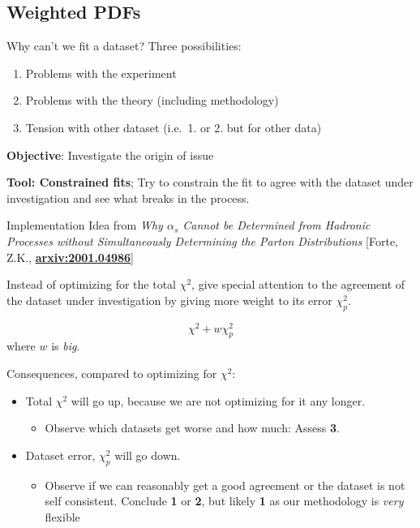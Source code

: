 \author[Zahari Kassabov]{}
\subsection{Weighted PDFs}
\begin{frame}{Why can't we fit a dataset?}
\protect\hypertarget{why-cant-we-fit-a-dataset}{}
Three possibilities:

\begin{enumerate}
\tightlist
\item
  Problems with the experiment
\item
  Problems with the theory (including methodology)
\item
  Tension with other dataset (i.e.~1. or 2. but for other data)
\end{enumerate}

\textbf{Objective}: Investigate the origin of issue

\textbf{Tool: Constrained fits}; Try to constrain the fit to agree with
the dataset under investigation and see what breaks in the process.
\end{frame}

\begin{frame}{Implementation}
\protect\hypertarget{implementation}{}
Idea from \emph{Why \(\alpha_s\) Cannot be Determined from Hadronic
Processes without Simultaneously Determining the Parton Distributions}
{[}Forte, Z.K.,
\href{https://arxiv.org/abs/2001.04986}{\textbf{arxiv:2001.04986}}{]}

Instead of optimizing for the total \(\chi^2\), give special attention
to the agreement of the dataset under investigation by giving more
weight to its error \(\chi^2_p\).

\[
\chi^2 + w \chi^2_p
\] where \(w\) is \emph{big}.

Consequences, compared to optimizing for \(\chi^2\):

\begin{itemize}
\tightlist
\item
  Total \(\chi^2\) will go up, because we are not optimizing for it any
  longer.

  \begin{itemize}
  \tightlist
  \item
    Observe which datasets get worse and how much: Assess \textbf{3}.
  \end{itemize}
\item
  Dataset error, \(\chi^2_p\) will go down.

  \begin{itemize}
  \tightlist
  \item
    Observe if we can reasonably get a good agreement or the dataset is
    not self consistent. Conclude \textbf{1} or \textbf{2}, but likely
    \textbf{1} as our methodology is \emph{very} flexible
  \end{itemize}
\end{itemize}
\end{frame}


